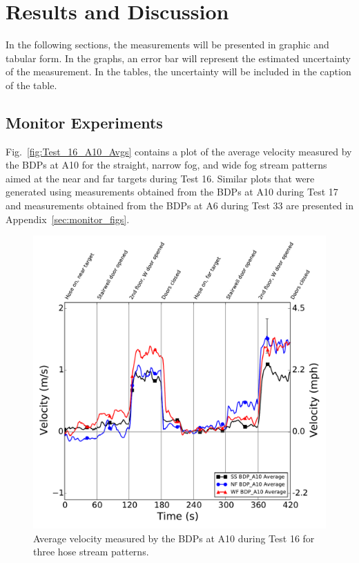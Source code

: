 \documentclass[12pt,oneside]{book}
\begin{document}

\chapter{Results and Discussion}
\label{chap:results}
In the following sections, the measurements will be presented in graphic and tabular form. In the graphs, an error bar will represent the estimated uncertainty of the measurement. In the tables, the uncertainty will be included in the caption of the table.

\section{Monitor Experiments}
\label{sec:monitor_results}

Fig.~\ref{fig:Test_16_A10_Avgs} contains a plot of the average velocity measured by the BDPs at A10 for the straight, narrow fog, and wide fog stream patterns aimed at the near and far targets during Test 16. Similar plots that were generated using measurements obtained from the BDPs at A10 during Test 17 and measurements obtained from the BDPs at A6 during Test 33 are presented in Appendix~\ref{sec:monitor_figs}.

\begin{figure}[!ht]
	\includegraphics[width=\columnwidth]{../Figures/Plots/Test_16_West_063014_BDP_A10_stream_avgs}
	\caption{Average velocity measured by the BDPs at A10 during Test 16 for three hose stream patterns.}
	\label{fig:Test_16_BDP_A10_Avg_All}
\end{figure}
\FloatBarrier
\end{document}
